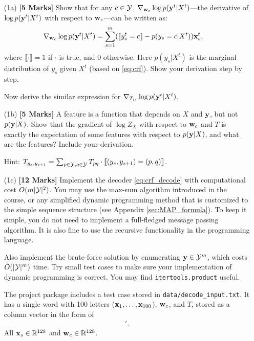 \documentclass[11pt]{report}
\begin{document}
	
	\begin{itemize}
		\item[(1a)] {\bf [5 Marks]} Show that for any $c \in \mathcal{Y}$, 
		${\nabla}_{\mathbf{\boldsymbol{w}}_c} \log p(\mathbf{\boldsymbol{y}}^t|X^t)$---the derivative of $\log p(\mathbf{\boldsymbol{y}}^t|X^t)$ with respect to $\mathbf{\boldsymbol{w}}_c$---can be written as:
		\begin{align}
			{\nabla}_{\mathbf{\boldsymbol{w}}_c} \log p(\mathbf{\boldsymbol{y}}^t|X^t) & = \sum_{s=1}^m ([\![y^t_s = c]\!] - p(y_s = c | X^t)) \mathbf{\boldsymbol{x}}^t_s,
		\end{align}
		where $\llbracket \cdot \rrbracket = 1$ if $\cdot$ is true, and 0 otherwise.
		Here $p(y_s | X^t)$ is the marginal distribution of $y_s$ given $X^t$ (based on \eqref{eq:crf}).
		Show your derivation step by step.
		
		Now derive the similar expression for ${\nabla}_{T_{ij}} \log p(\mathbf{\boldsymbol{y}}^t|X^t)$.
		
		\item[(1b)] {\bf [5 Marks]} A feature is a function that depends on $X$ and $\mathbf{\boldsymbol{y}}$, but not $p(\mathbf{\boldsymbol{y}}|X)$. Show that the gradient of $\log Z_X$ with respect to $\mathbf{\boldsymbol{w}}_c$ and $T$ is exactly the expectation of some features with respect to $p(\mathbf{\boldsymbol{y}} | X)$, and what are the features? Include your derivation.
		
		Hint: $T_{y_s, y_{s+1}} = \sum_{p \in \mathcal{Y}, q \in \mathcal{Y}} T_{pq} \cdot \llbracket (y_s, y_{s+1}) = (p,q)  \rrbracket$.
		
		\item[(1c)] 
		\label{qn:decoding}
		{\bf [12 Marks]} Implement the decoder \eqref{eq:crf_decode} with computational cost $O(m|\mathcal{Y}|^2)$.
		You may use the max-sum algorithm introduced in the course, or any simplified dynamic programming method that is customized to the simple sequence structure (see Appendix \ref{sec:MAP_formula}). 
		To keep it simple, you do not need to implement a full-fledged message passing algorithm.
		It is also fine to use the recursive functionality in the programming language.
		
		Also implement the brute-force solution by enumerating $\mathbf{\boldsymbol{y}} \in \mathcal{Y}^m$, which costs $O(|\mathcal{Y}|^m)$ time.  Try small test cases to make sure your implementation of dynamic programming is correct.
		You may find \verb#itertools.product# useful.
		
		The project package includes a test case stored in \verb#data/decode_input.txt#.
		It has a single word with 100 letters ($\mathbf{\boldsymbol{x}}_1, \ldots, \mathbf{\boldsymbol{x}}_{100}$), $\mathbf{\boldsymbol{w}}_c$, and $T$, stored as a column vector in the form of
		\begin{align}
			[\xvec'_1, \ldots, \xvec'_{100}, \wvec'_1, \ldots, \wvec'_{26}, T_{1,1}, T_{1,2}, \ldots, T_{1, 26}, T_{2,1}, \ldots, T_{2, 26}, \ldots, T_{26,1}, \ldots, T_{26, 26}]'.
		\end{align}
		All $\mathbf{\boldsymbol{x}}_s \in \mathbb{R}^{128}$ and $\mathbf{\boldsymbol{w}}_c \in \mathbb{R}^{128}$.
		

\end{itemize}
\end{document}
